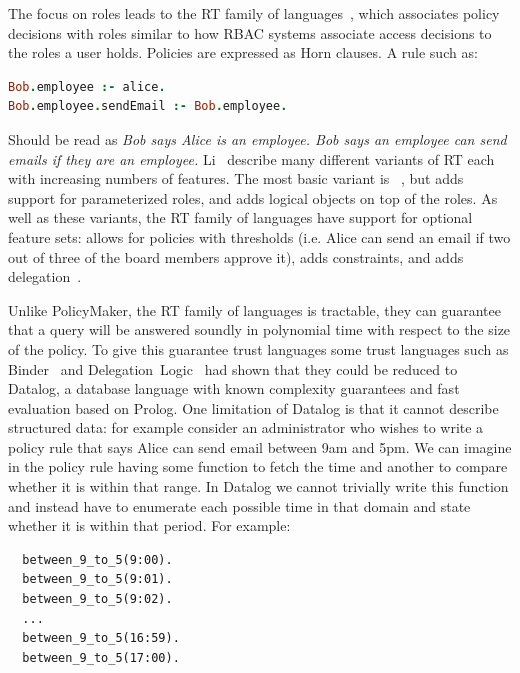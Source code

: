 \documentclass[thesis.tex]{subfiles}
\begin{document}
The focus on roles leads to the RT family of
languages~\cite{ninghui_li_design_2002}, which associates policy
decisions with roles similar to how \ac{RBAC} systems associate access
decisions to the roles a user holds.  Policies are expressed as Horn
clauses.  A rule such as:

\begin{lstlisting}[language=prolog]
Bob.employee :- alice.
Bob.employee.sendEmail :- Bob.employee.
\end{lstlisting}

Should be read as \emph{Bob says Alice is an employee.  Bob says an
employee can send emails if they are an employee.}  Li~\etal{}
describe many different variants of RT each with increasing numbers of
features.  The most basic variant is
~\cite{li_distributed_2003}, but  adds support for
parameterized roles, and  adds logical objects on top of the
roles.  As well as these variants, the RT family of languages have
support for optional feature sets:  allows for policies with
thresholds (i.e. Alice can send an email if two out of three of the
board members approve it),  adds constraints, and 
adds delegation~\cite{ninghui_li_design_2002}.

Unlike PolicyMaker, the RT family of languages is tractable, they can
guarantee that a query will be answered soundly in polynomial time
with respect to the size of the policy.  To give this guarantee trust
languages some trust languages such as
Binder~\cite{detreville_binder_2002} and
Delegation~Logic~\cite{li_delegation_2003,li_practically_2000} had
shown that they could be reduced to Datalog, a database language with
known complexity guarantees and fast evaluation based on Prolog.  One
limitation of Datalog is that it cannot describe structured data: for
example consider an administrator who wishes to write a policy rule
that says Alice can send email between 9am and 5pm.  We can imagine in
the policy rule having some function to fetch the time and another to
compare whether it is within that range.  In Datalog we cannot
trivially write this function and instead have to enumerate each
possible time in that domain and state whether it is within that
period. For example:

\begin{lstlisting}
  between_9_to_5(9:00).
  between_9_to_5(9:01).
  between_9_to_5(9:02).
  ...
  between_9_to_5(16:59).
  between_9_to_5(17:00).
\end{lstlisting}
\end{document}
